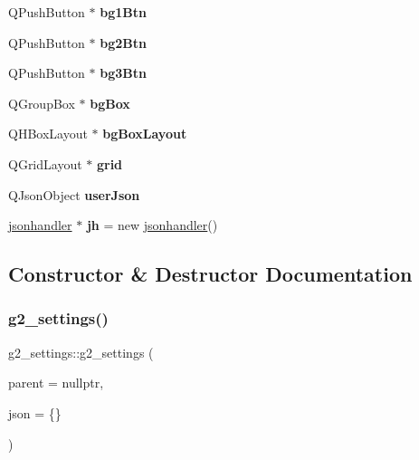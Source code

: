 \begin{DoxyCompactItemize}
Q\+Push\+Button $\ast$ {\bfseries bg1\+Btn}
\item 
\mbox{\label{classg2__settings_a27baaf9a1bce1c7025358408979b74d2}} 
Q\+Push\+Button $\ast$ {\bfseries bg2\+Btn}
\item 
\mbox{\label{classg2__settings_a46b7fa02e6e84f1b6d9f5bff74d0c8b2}} 
Q\+Push\+Button $\ast$ {\bfseries bg3\+Btn}
\item 
\mbox{\label{classg2__settings_a40794e8bcc953a858f2f5edc27271ee9}} 
Q\+Group\+Box $\ast$ {\bfseries bg\+Box}
\item 
\mbox{\label{classg2__settings_a8079d8ed4dffc37edc1bb1f003fda59a}} 
Q\+H\+Box\+Layout $\ast$ {\bfseries bg\+Box\+Layout}
\item 
\mbox{\label{classg2__settings_aa8b3e291021e81f7a90acab406b37546}} 
Q\+Grid\+Layout $\ast$ {\bfseries grid}
\item 
\mbox{\label{classg2__settings_a807af0ce75f72e99bb67a105dfa7ba41}} 
Q\+Json\+Object {\bfseries user\+Json}
\item 
\mbox{\label{classg2__settings_a889d9695a4d3489fe256fe1ef00a9d17}} 
\hyperlink{classjsonhandler}{jsonhandler} $\ast$ {\bfseries jh} = new \hyperlink{classjsonhandler}{jsonhandler}()
\end{DoxyCompactItemize}


\subsection{Constructor \& Destructor Documentation}
\mbox{\label{classg2__settings_a3eb448dda234abb813d6a32bebebbcde}} 
\subsubsection{\texorpdfstring{g2\+\_\+settings()}{g2\_settings()}}
{\footnotesize\ttfamily g2\+\_\+settings\+::g2\+\_\+settings (\begin{DoxyParamCaption}\item[{Q\+Widget $\ast$}]{parent = {\ttfamily nullptr},  }\item[{Q\+Json\+Object}]{json = {\ttfamily \{\}} }\end{DoxyParamCaption})\hspace{0.3cm}{\ttfamily [explicit]}}



